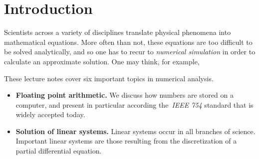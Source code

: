 \chapter*{Introduction}%
Scientists across a variety of disciplines translate physical phenomena into mathematical equations.
More often than not,
these equations are too difficult to be solved analytically,
and so one has to recur to \emph{numerical simulation} in order to calculate an approximate solution.
One may think, for example,

These lecture notes cover six important topics in numerical analysis.

\begin{itemize}
    \item 
        \textbf{Floating point arithmetic.} 
        We discuss how numbers are stored on a computer, 
        and present in particular according the~\emph{IEEE 754} standard that is widely accepted today.

    \item 
        \textbf{Solution of linear systems.} 
        Linear systems occur in all branches of science. 
        Important linear systems are those resulting from the discretization of a partial differential equation.
\end{itemize}
